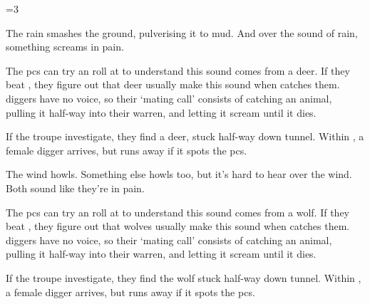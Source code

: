 \ifnum\value{cycle}=3

\ifodd\value{r2}

  \begin{boxtext}
    The rain smashes the ground, pulverising it to mud.
    And over the sound of rain, something screams in pain.
  \end{boxtext}

  The \glspl{pc} can try an  roll at \tn[10] to understand this sound comes from a deer.
  If they beat \tn[12], they figure out that deer usually make this sound when  catches them.
  \Glspl{digger} have no voice, so their `mating call' consists of catching an animal, pulling it half-way into their warren, and letting it scream until it dies.

  If the troupe investigate, they find a deer, stuck half-way down  tunnel.
  Within , a female \gls{digger} arrives, but runs away if it spots the \glspl{pc}.

\else

  \begin{boxtext}
    The wind howls.
    Something else howls too, but it's hard to hear over the wind.
    Both sound like they're in pain.
  \end{boxtext}

  The \glspl{pc} can try an  roll at \tn[10] to understand this sound comes from a wolf.
  If they beat \tn[12], they figure out that wolves usually make this sound when  catches them.
  \Glspl{digger} have no voice, so their `mating call' consists of catching an animal, pulling it half-way into their warren, and letting it scream until it dies.

  If the troupe investigate, they find the wolf stuck half-way down  tunnel.
  Within , a female \gls{digger} arrives, but runs away if it spots the \glspl{pc}.

\fi

\fi
